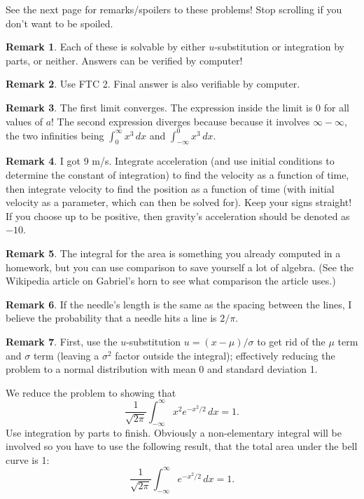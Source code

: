 \documentclass[11pt,oneside]{amsart}
\theoremstyle{definition}
\newtheorem{remark}{Remark}
\begin{document}
\bigskip
See the next page for remarks/spoilers to these problems! Stop scrolling if you don't want to be spoiled.

\newpage

\begin{remark}
    Each of these is solvable by either $u$-substitution or integration by parts, or neither. Answers can be verified by computer!
\end{remark}

\begin{remark}
    Use FTC 2. Final answer is also verifiable by computer.
\end{remark}

\begin{remark}
    The first limit converges. The expression inside the limit is 0 for all values of $a$! The second expression diverges because because it involves $\infty-\infty$, the two infinities being $\int_0^\infty x^3\,dx$ and $\int_{-\infty}^0x^3\,dx$.
\end{remark}

\begin{remark}
    I got 9 m/s. Integrate acceleration (and use initial conditions to determine the constant of integration) to find the velocity as a function of time, then integrate velocity to find the position as a function of time (with initial velocity as a parameter, which can then be solved for). Keep your signs straight! If you choose up to be positive, then gravity's acceleration should be denoted as $-10$.
\end{remark}

\begin{remark}
    The integral for the area is something you already computed in a homework, but you can use comparison to save yourself a lot of algebra. (See the Wikipedia article on Gabriel's horn to see what comparison the article uses.)
\end{remark}

\begin{remark}
    If the needle's length is the same as the spacing between the lines, I believe the probability that a needle hits a line is $2/\pi$.
\end{remark}

\begin{remark}
    First, use the $u$-substitution $u=(x-\mu)/\sigma$ to get rid of the $\mu$ term and $\sigma$ term (leaving a $\sigma^2$ factor outside the integral); effectively reducing the problem to a normal distribution with mean 0 and standard deviation 1.

    We reduce the problem to showing that
    \[\frac 1{\sqrt{2\pi}}\int_{-\infty}^\infty x^2e^{-x^2/2}\,dx=1.\]
    Use integration by parts to finish. Obviously a non-elementary integral will be involved so you have to use the following result, that the total area under the bell curve is 1:
    \[\frac 1{\sqrt{2\pi}}\int_{-\infty}^\infty e^{-x^2/2}\,dx=1.\]
\end{remark}
\end{document}
